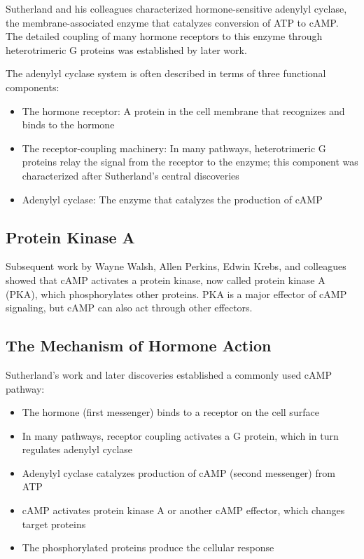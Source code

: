 Sutherland and his colleagues characterized hormone-sensitive adenylyl cyclase, the membrane-associated enzyme that catalyzes conversion of ATP to cAMP. The detailed coupling of many hormone receptors to this enzyme through heterotrimeric G proteins was established by later work.

The adenylyl cyclase system is often described in terms of three functional components:

\begin{itemize}
\item The hormone receptor: A protein in the cell membrane that recognizes and binds to the hormone
\item The receptor-coupling machinery: In many pathways, heterotrimeric G proteins relay the signal from the receptor to the enzyme; this component was characterized after Sutherland's central discoveries
\item Adenylyl cyclase: The enzyme that catalyzes the production of cAMP
\end{itemize}

\subsection{Protein Kinase A}

Subsequent work by Wayne Walsh, Allen Perkins, Edwin Krebs, and colleagues showed that cAMP activates a protein kinase, now called protein kinase A (PKA), which phosphorylates other proteins. PKA is a major effector of cAMP signaling, but cAMP can also act through other effectors.

\subsection{The Mechanism of Hormone Action}

Sutherland's work and later discoveries established a commonly used cAMP pathway:

\begin{itemize}
\item The hormone (first messenger) binds to a receptor on the cell surface
\item In many pathways, receptor coupling activates a G protein, which in turn regulates adenylyl cyclase
\item Adenylyl cyclase catalyzes production of cAMP (second messenger) from ATP
\item cAMP activates protein kinase A or another cAMP effector, which changes target proteins
\item The phosphorylated proteins produce the cellular response
\end{itemize}

